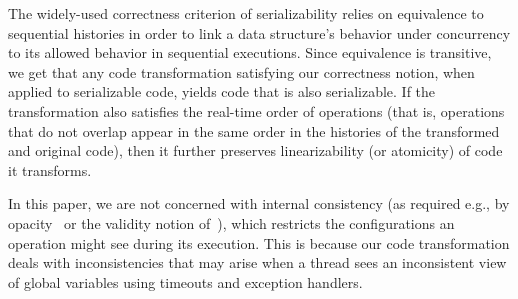 The widely-used correctness criterion of serializability relies on equivalence to sequential histories in order to
link a data structure's behavior under concurrency to its allowed behavior in sequential executions. Since equivalence is transitive, 
we get that any code transformation satisfying our correctness notion, when applied to serializable code, yields code that is also serializable.
If the transformation also satisfies the real-time order of operations (that is, operations that do not overlap appear in the same order in the
histories of the transformed and original code), then it further preserves linearizability (or atomicity) of code it transforms.

In this paper, we are not concerned with internal consistency (as required e.g., by opacity~\cite{GuerraouiK2008} or the validity notion of~\cite{LevAriCK2014}), 
which restricts the configurations an operation might see during its execution. 
This is because our code transformation deals with inconsistencies that may arise when a thread sees an inconsistent view of global variables using 
timeouts and exception handlers. 

